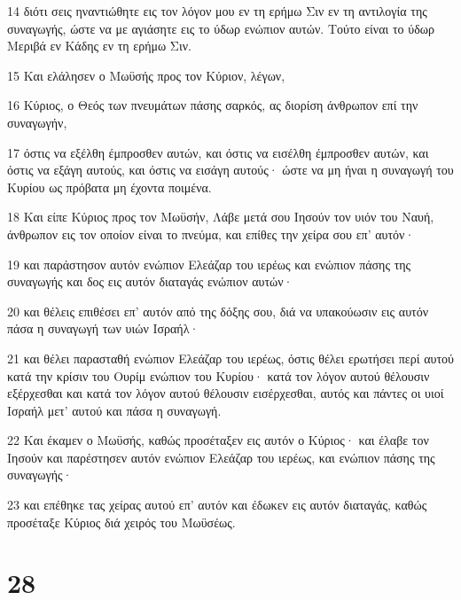 \par 14 διότι σεις ηναντιώθητε εις τον λόγον μου εν τη ερήμω Σιν εν τη αντιλογία της συναγωγής, ώστε να με αγιάσητε εις το ύδωρ ενώπιον αυτών. Τούτο είναι το ύδωρ Μεριβά εν Κάδης εν τη ερήμω Σιν.
\par 15 Και ελάλησεν ο Μωϋσής προς τον Κύριον, λέγων,
\par 16 Κύριος, ο Θεός των πνευμάτων πάσης σαρκός, ας διορίση άνθρωπον επί την συναγωγήν,
\par 17 όστις να εξέλθη έμπροσθεν αυτών, και όστις να εισέλθη έμπροσθεν αυτών, και όστις να εξάγη αυτούς, και όστις να εισάγη αυτούς· ώστε να μη ήναι η συναγωγή του Κυρίου ως πρόβατα μη έχοντα ποιμένα.
\par 18 Και είπε Κύριος προς τον Μωϋσήν, Λάβε μετά σου Ιησούν τον υιόν του Ναυή, άνθρωπον εις τον οποίον είναι το πνεύμα, και επίθες την χείρα σου επ' αυτόν·
\par 19 και παράστησον αυτόν ενώπιον Ελεάζαρ του ιερέως και ενώπιον πάσης της συναγωγής και δος εις αυτόν διαταγάς ενώπιον αυτών·
\par 20 και θέλεις επιθέσει επ' αυτόν από της δόξης σου, διά να υπακούωσιν εις αυτόν πάσα η συναγωγή των υιών Ισραήλ·
\par 21 και θέλει παρασταθή ενώπιον Ελεάζαρ του ιερέως, όστις θέλει ερωτήσει περί αυτού κατά την κρίσιν του Ουρίμ ενώπιον του Κυρίου· κατά τον λόγον αυτού θέλουσιν εξέρχεσθαι και κατά τον λόγον αυτού θέλουσιν εισέρχεσθαι, αυτός και πάντες οι υιοί Ισραήλ μετ' αυτού και πάσα η συναγωγή.
\par 22 Και έκαμεν ο Μωϋσής, καθώς προσέταξεν εις αυτόν ο Κύριος· και έλαβε τον Ιησούν και παρέστησεν αυτόν ενώπιον Ελεάζαρ του ιερέως, και ενώπιον πάσης της συναγωγής·
\par 23 και επέθηκε τας χείρας αυτού επ' αυτόν και έδωκεν εις αυτόν διαταγάς, καθώς προσέταξε Κύριος διά χειρός του Μωϋσέως.

\chapter{28}


